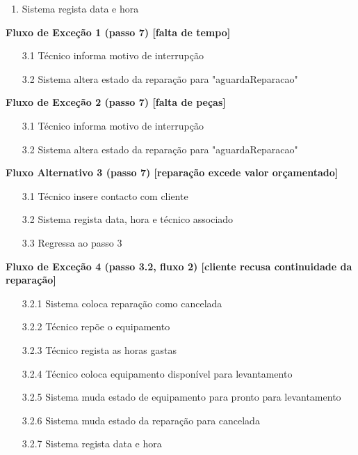 \documentclass[../relatorio.tex]{subfiles}
\begin{document}
\begin{itemize}
\begin{enumerate}
              \item Sistema regista data e hora
          \end{enumerate}
          \begin{flushleft}
              \textbf{Fluxo de Exceção 1 (passo 7) [falta de tempo]}
          \end{flushleft}
          \begin{itemize}
              \item[3.1]{Técnico informa motivo de interrupção}
              \item[3.2]{Sistema altera estado da reparação para "aguardaReparacao"}
          \end{itemize}
          \begin{flushleft}
              \textbf{Fluxo de Exceção 2 (passo 7) [falta de peças]}
          \end{flushleft}
          \begin{itemize}
              \item[3.1]{Técnico informa motivo de interrupção}
              \item[3.2]{Sistema altera estado da reparação para "aguardaReparacao"}
          \end{itemize}
          \begin{flushleft}
              \textbf{Fluxo Alternativo 3 (passo 7) [reparação excede valor orçamentado]}
          \end{flushleft}
          \begin{itemize}
              \item[3.1]{Técnico insere contacto com cliente}
              \item[3.2]{Sistema regista data, hora e técnico associado}
              \item[3.3]{Regressa ao passo 3}
          \end{itemize}
          \begin{flushleft}
              \textbf{Fluxo de Exceção 4 (passo 3.2, fluxo 2) [cliente recusa continuidade da reparação]}
          \end{flushleft}
          \begin{itemize}
              \item[3.2.1]{Sistema coloca reparação como cancelada}
              \item[3.2.2]{Técnico repõe o equipamento}
              \item[3.2.3]{Técnico regista as horas gastas}
              \item[3.2.4]{Técnico coloca equipamento disponível para levantamento}
              \item[3.2.5]{Sistema muda estado de equipamento para pronto para levantamento}
              \item[3.2.6]{Sistema muda estado da reparação para cancelada}
              \item[3.2.7]{Sistema regista data e hora} 
          \end{itemize}
\end{itemize}
\end{document}
